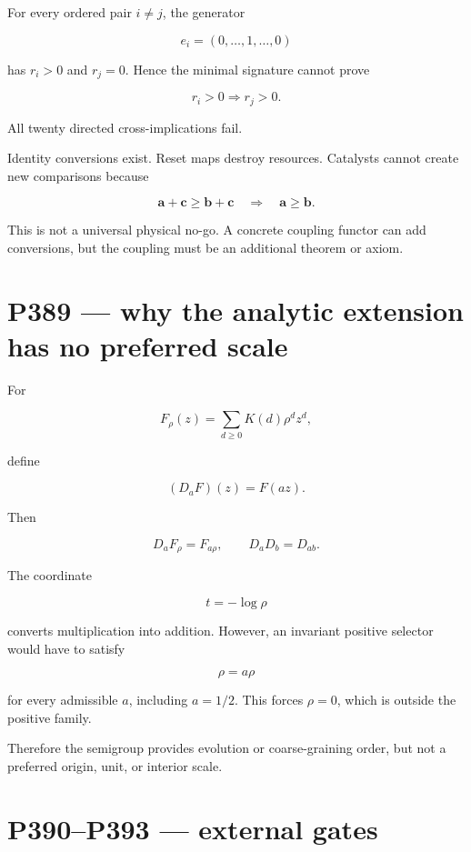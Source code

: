 \documentclass[11pt,a4paper,openany]{report}
\begin{document}
For every ordered pair \(i\neq j\), the generator

\[
e_i=(0,\ldots,1,\ldots,0)
\]

has \(r_i>0\) and \(r_j=0\). Hence the minimal signature cannot prove

\[
r_i>0\Longrightarrow r_j>0.
\]

All twenty directed cross-implications fail.

Identity conversions exist. Reset maps destroy resources. Catalysts cannot create new comparisons because

\[
\mathbf a+\mathbf c\geq\mathbf b+\mathbf c
\quad\Longrightarrow\quad
\mathbf a\geq\mathbf b.
\]

This is not a universal physical no-go. A concrete coupling functor can add conversions, but the coupling must be an additional theorem or axiom.

\chapter{P389 --- why the analytic extension has no preferred scale}

For

\[
F_\rho(z)=\sum_{d\geq0}K(d)\rho^dz^d,
\]

define

\[
(D_aF)(z)=F(az).
\]

Then

\[
D_aF_\rho=F_{a\rho},
\qquad
D_aD_b=D_{ab}.
\]

The coordinate

\[
t=-\log\rho
\]

converts multiplication into addition. However, an invariant positive selector would have to satisfy

\[
\rho=a\rho
\]

for every admissible \(a\), including \(a=1/2\). This forces \(\rho=0\), which is outside the positive family.

Therefore the semigroup provides evolution or coarse-graining order, but not a preferred origin, unit, or interior scale.

\chapter{P390--P393 --- external gates}
\end{document}
